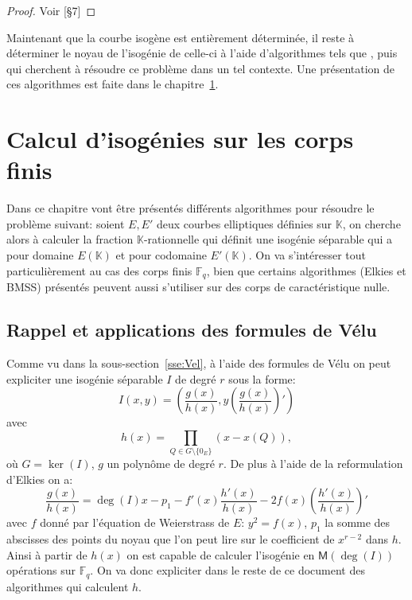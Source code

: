 \documentclass[10pt,a4paper]{book}
\theoremstyle{plain}
\theoremstyle{definition}
\theoremstyle{definition}
\theoremstyle{definition}
\theoremstyle{definition}
\theoremstyle{definition}
\theoremstyle{remark}
\theoremstyle{remark}
\theoremstyle{definition}
\begin{document}
\begin{proof}
Voir \cite{Schoof95}[§7]
\end{proof}

Maintenant que la courbe isogène est entièrement déterminée, il reste à déterminer le noyau de l'isogénie de celle-ci à l'aide d'algorithmes tels que \cite{Elkies1998}, \cite{BMSS08}  puis \cite{Lercier-Sirvent2008} qui cherchent à résoudre ce problème dans un tel contexte. Une présentation de ces algorithmes est faite dans le chapitre~\ref{cha:iso:computing}.

\chapter{Calcul d'isogénies sur les corps finis}
\label{cha:iso:computing}
Dans ce chapitre vont être présentés différents algorithmes pour résoudre le 
problème suivant: soient $E, E'$ deux courbes elliptiques définies sur 
$\mathbb{K}$, on cherche alors à calculer la fraction $\mathbb{K}$-rationnelle 
qui définit une isogénie séparable qui a pour domaine $E(\mathbb{K})$ et pour 
codomaine $E'(\mathbb{K})$.
On va s'intéresser tout particulièrement au cas des corps finis $\mathbb{F}_q$, bien que certains algorithmes (Elkies et BMSS) présentés peuvent aussi s'utiliser sur des corps de caractéristique nulle.

\section{Rappel et applications des formules de Vélu}
Comme vu dans la sous-section~\ref{sse:Vel}, à l'aide des formules de Vélu on peut expliciter une isogénie séparable $I$ de degré $r$ sous la forme:
\begin{equation} 
I(x,y)=\left(\frac{g(x)}{h(x)},y\left( \frac{g(x)}{h(x)} \right)'\right)
\end{equation}
avec 
\begin{equation*}
h(x)=\prod_{Q \in G \setminus \{0_E\}}(x-x(Q)),
\end{equation*}
où $G=\ker(I)$, $g$ un polynôme de degré $r$. De plus à l'aide de la reformulation d'Elkies on a:
\begin{equation}
\label{eq:vel:elk}
\frac{g(x)}{h(x)}= \deg(I) x -p_1 - f'(x) \frac{h'(x)}{h(x)} -2f(x)  \left(\frac{h'(x)}{h(x)}\right)'
\end{equation}
avec $f$ donné par l'équation de Weierstrass de $E$: $y^2=f(x)$, $p_1$ la somme
des abscisses des points du noyau que l'on peut lire sur le coefficient de 
$x^{r-2}$ dans $h$. Ainsi à partir de $h(x)$ on est capable de calculer 
l'isogénie en $\mathsf{M}(\deg(I))$ opérations sur $\mathbb{F}_q$. On va donc 
expliciter dans le reste de ce document des algorithmes qui calculent $h$.
\end{document}
